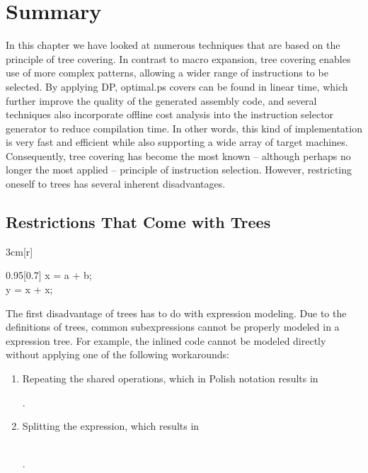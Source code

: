 {\section{Summary}

In this chapter we have looked at numerous techniques that are based on the
\gls{principle} of \gls{tree covering}.
%
In contrast to \gls{macro expansion},
\gls{tree covering} enables use of more complex \glspl{pattern}, allowing a
wider range of \glspl{instruction} to be selected.
%
By applying \glsdesc{DP},
\gls{optimal.ps} covers can be found in linear time, which further
improve the quality of the generated \gls{assembly code}, and several
techniques also incorporate \gls{offline cost analysis} into the
\gls{instruction selector} generator to reduce compilation time.
%
In other
words, this kind of implementation is very fast and efficient while also
supporting a wide array of \glspl{target machine}.
%
Consequently, \gls{tree
  covering} has become the most known -- although perhaps no longer the most
applied -- \gls{principle} of \gls{instruction selection}.
%
However,
restricting oneself to \glspl{tree} has several inherent disadvantages.


\subsection{Restrictions That Come with Trees}

\begin{inParFigure}{3cm}[r]%
  \centering%

  \vspace{0.1\baselineskip}%

  \begin{framedBoxWI}{0.95\textwidth}[0.7]
    \codeFontStyle%
    x = a + b;\\
    y = x + x;
  \end{framedBoxWI}

\end{inParFigure}%
\noindent
The first disadvantage of \glspl{tree} has to do with expression modeling.
%
Due
to the definitions of \glspl{tree}, common subexpressions cannot be properly
modeled in a \gls{expression tree}.
%
For example, the inlined code cannot be modeled
directly without applying one of the following workarounds:
\begin{enumerate}
  \item Repeating the shared operations, which in \gls{Polish notation} results
    in
    \begin{center}
      \small%
      .
    \end{center}
  \item Splitting the expression, which results in
    \begin{center}
      \small%
      \\
      .
    \end{center}
\end{enumerate}

}
